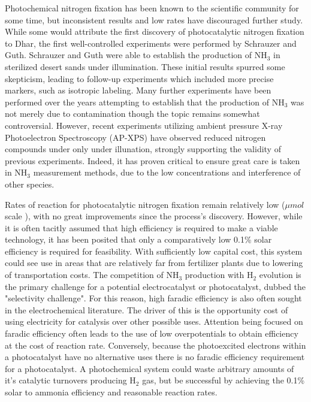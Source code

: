 Photochemical nitrogen fixation has been known to the scientific community for some time, but inconsistent results and low rates have discouraged further study.\cite{Medford_2017} While some would attribute the first discovery of photocatalytic nitrogen fixation to Dhar,\cite{Dhar_1941} the first well-controlled experiments were performed by Schrauzer and Guth.\cite{Schrauzer_1977} Schrauzer and Guth were able to establish the production of NH$_3$ in sterilized desert sands under illumination. These initial results spurred some skepticism, leading to follow-up experiments which included more precise markers, such as isotropic labeling.\cite{Schrauzer_1983} Many further experiments have been performed over the years attempting to establish that the production of NH$_3$ was not merely due to contamination\cite{Bickley_1979,Augugliaro_1982,Soria_1991,Li_2018,Yuan_2013,Hirakawa_2017} though the topic remains somewhat controversial. However, recent experiments utilizing ambient pressure X-ray Photoelectron Spectroscopy (AP-XPS) have observed reduced nitrogen compounds under only under illunation, strongly supporting the validity of previous experiments.\cite{Comer_2018b} Indeed, it has proven critical to ensure great care is taken in NH$_3$ measurement methods, due to the low concentrations and interference of other species.\cite{Gao_2018,Cui2018}


Rates of reaction for photocatalytic nitrogen fixation remain relatively low ($\mu mol$ scale \cite{Hirakawa_2017}), with no great improvements since the process's discovery. However, while it is often tacitly assumed that high efficiency is required to make a viable technology, it has been posited that only a comparatively low 0.1\% solar efficiency is required for feasibility.\cite{Comer_2019,Medford_2017} With sufficiently low capital cost, this system could see use in areas that are relatively far from fertilizer plants due to lowering of transportation costs. The competition of NH$_3$ production with H$_2$ evolution is the primary challenge for a potential electrocatalyst or photocatalyst, dubbed the "selectivity challenge".\cite{Singh_2017} For this reason, high faradic efficiency is also often sought in the electrochemical literature.\cite{McPherson_2019} The driver of this is the opportunity cost of using electricity for catalysis over other possible uses. Attention being focused on faradic efficiency often leads to the use of low overpotentials to obtain efficiency at the cost of reaction rate. Conversely, because the photoexcited electrons within a photocatalyst have no alternative uses there is no faradic efficiency requirement for a photocatalyst. A photochemical system could waste arbitrary amounts of it's catalytic turnovers producing H$_2$ gas, but be successful by achieving the 0.1\% solar to ammonia efficiency and reasonable reaction rates. %

